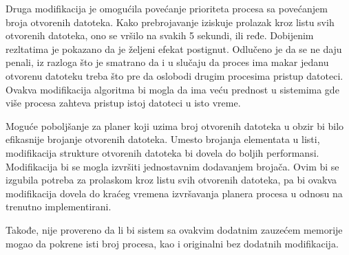 Druga modifikacija je omogućila povećanje prioriteta procesa sa povećanjem broja otvorenih datoteka. Kako prebrojavanje iziskuje prolazak kroz listu svih otvorenih datoteka, ono se vršilo na svakih 5 sekundi, ili ređe. Dobijenim rezltatima je pokazano da je željeni efekat postignut. Odlučeno je da se ne daju penali, iz razloga što je smatrano da i u slučaju da proces ima makar jedanu otvorenu datoteku treba što pre da oslobodi drugim procesima pristup datoteci. Ovakva modifikacija algoritma bi mogla da ima veću prednost u sistemima gde više procesa zahteva pristup istoj datoteci u isto vreme. 

Moguće poboljšanje za planer koji uzima broj otvorenih datoteka u obzir bi bilo efikasnije brojanje otvorenih datoteka. Umesto brojanja elementata u listi, modifikacija strukture otvorenih datoteka bi dovela do boljih performansi. Modifikacija bi se mogla izvršiti jednostavnim dodavanjem brojača. Ovim bi se izgubila potreba za prolaskom kroz listu svih otvorenih datoteka, pa bi ovakva modifikacija dovela do kraćeg vremena izvršavanja planera procesa u odnosu na trenutno implementirani.

Takođe, nije provereno da li bi sistem sa ovakvim dodatnim zauzećem memorije mogao da pokrene isti broj procesa, kao i originalni bez dodatnih modifikacija.

